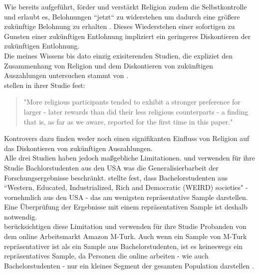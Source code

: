 \documentclass[11pt,a4paper]{article}
\begin{document}
Wie bereits aufgeführt, förder und verstärkt Religion zudem die Selbstkontrolle und erlaubt es, Belohnungen “jetzt“ zu widerstehen um dadurch eine größere zukünftige Belohnung zu erhalten \parencite{mccullough2009religion, rounding2012religion, kim2015longitudinal}. Dieses Wiederstehen einer sofortigen  zu Gunsten einer zukünftigen Entlohnung impliziert ein geringeres Diskontieren der zukünftigen Entlohnung.\\


Die meines Wissens bis dato einzig exisiterenden Studien, die expliziet den Zusammenhang von Religion und dem Diskontieren von zukünftigen Auszahlungen untersuchen stammt von \textcite{carter2012religious, thornton2015divine, benjamin2013religious}.\\


\textcite{carter2012religious} stellen in ihrer Studie  fest: 

\begin{quote}
"More religious participants tended to exhibit a stronger preference for larger - later rewards than did their less religious counterparts - a finding that is, as far as we aware, reported for the first time in this paper."
\end{quote} 

Kontrovers dazu finden weder \textcite{thornton2015divine} noch \textcite{benjamin2013religious} einen signifikanten Einfluss von Religion auf das Diskontieren von zukünftigen Auszahlungen.\\
 
Alle drei Studien haben jedoch maßgebliche Limitationen. \textcite{benjamin2013religious} und \textcite{carter2012religious} verwenden für ihre Studie Bachlorstudenten aus den USA was die Generalisierbarbeit der Forschungsergebnisse beschränkt\parencite{carter2012religious}. \textcite{henrich2010weirdest} stellte fest, dass Bachelorstudenten aus “Western, Educated, Industrialized, Rich and Democratic (WEIRD) societies" - vornehmlich aus den USA - das am wenigsten repräsentative Sample darstellen. Eine Überprüfung der Ergebnisse mit einem repräsentativen Sample ist deshalb notwendig.\\
\textcite{thornton2015divine} berücksichtigen diese Limitation und verwenden für ihre Studie Probanden von dem online Arbeitsmarkt Amazon M-Turk. Auch wenn ein Sample von M-Turk  repräsentativer ist als ein Sample aus Bachelorstudenten, ist es keineswegs ein repräsentatives Sample, da Personen die online arbeiten - wie auch Bachelorstudenten - nur ein kleines Segment der gesamten Population darstellen \parencite{horton2011online}.\\
\end{document}
